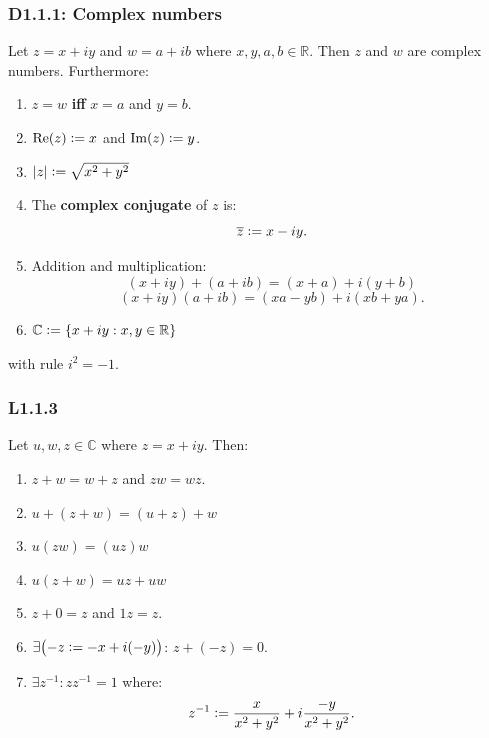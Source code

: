 \documentclass{article}
\newcommand{\deq}{\vcentcolon=}
\begin{document}
\begin{multicols*}{3}
\noindent

\subsubsection*{D1.1.1: Complex numbers}
Let $z=x+iy$ and $w=a+ib$ where $x,y,a,b\in\mathbb{R}$.
Then $z$ and $w$ are complex numbers. Furthermore:
\begin{enumerate}
    \item $z=w$ \textbf{if{}f} $x=a$ and $y=b$.
    
    \item $\Re(z)\deq x$ and $\Im(z)\deq y$.
    
    \item $|z|\deq\sqrt{x^2+y^2}$
    
    \item The \textbf{complex conjugate} of $z$ is:
    $$\overline{z}\deq x-iy.$$

    \item Addition and multiplication:
    $$(x+iy)+(a+ib)=(x+a)+i(y+b)$$
    $$(x+iy)(a+ib)=(xa-yb)+i(xb+ya).$$

    \item $\mathbb{C}\deq\{x+iy:x,y\in\mathbb{R}\}$
\end{enumerate}
with rule $i^2=-1$.

\subsubsection*{L1.1.3}
Let $u,w,z\in\mathbb{C}$ where $z=x+iy$. Then:
\begin{enumerate}
    \item $z+w=w+z$ and $zw=wz$.
    
    \item $u+(z+w)=(u+z)+w$
    
    \item $u(zw)=(uz)w$
    
    \item $u(z+w)=uz+uw$
    
    \item $z+0=z$ and $1z=z$.
    
    \item $\exists\bigl(-z\deq-x+i(-y)\bigr)$:
    $z+(-z)=0$.

    \item $\exists z^{-1}: zz^{-1}=1$ where:
    $$z^{-1}\deq\frac{x}{x^2+y^2}+i\frac{-y}{x^2+y^2}.$$
\end{enumerate}


\end{multicols*}
\end{document}
